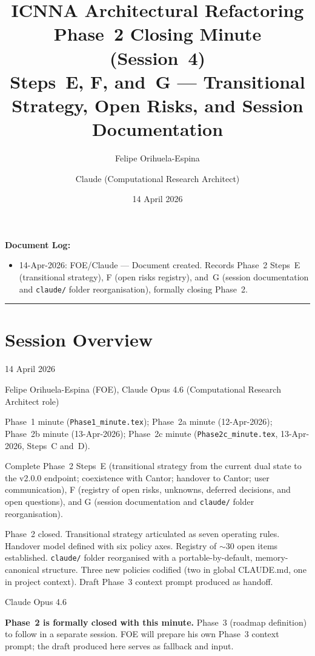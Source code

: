 \documentclass[11pt,a4paper]{article}
\title{ICNNA Architectural Refactoring\\Phase~2 Closing Minute (Session~4)\\
\large Steps~E, F, and~G --- Transitional Strategy, Open Risks, and Session Documentation}
\author{Felipe Orihuela-Espina \and Claude (Computational Research Architect)}
\date{14 April 2026}
\begin{document}
\maketitle

\noindent\textbf{Document Log:}
\begin{itemize}[nosep]
    \item 14-Apr-2026: FOE/Claude --- Document created. Records Phase~2 Steps~E (transitional strategy), F (open risks registry), and~G (session documentation and \texttt{claude/} folder reorganisation), formally closing Phase~2.
\end{itemize}

\vspace{1em}
\hrule
\vspace{1em}

\section{Session Overview}

\begin{description}[style=nextline]
    \item[Date:] 14 April 2026
    \item[Participants:] Felipe Orihuela-Espina (FOE), Claude Opus 4.6 (Computational Research Architect role)
    \item[Predecessors:] Phase~1 minute (\texttt{Phase1\_minute.tex}); Phase~2a minute (12-Apr-2026); Phase~2b minute (13-Apr-2026); Phase~2c minute (\texttt{Phase2c\_minute.tex}, 13-Apr-2026, Steps~C and~D).
    \item[Objective:] Complete Phase~2 Steps~E (transitional strategy from the current dual state to the v2.0.0 endpoint; coexistence with Cantor; handover to Cantor; user communication), F (registry of open risks, unknowns, deferred decisions, and open questions), and G (session documentation and \texttt{claude/} folder reorganisation).
    \item[Outcome:] Phase~2 closed. Transitional strategy articulated as seven operating rules. Handover model defined with six policy axes. Registry of $\sim$30 open items established. \texttt{claude/} folder reorganised with a portable-by-default, memory-canonical structure. Three new policies codified (two in global CLAUDE.md, one in project context). Draft Phase~3 context prompt produced as handoff.
    \item[Model used:] Claude Opus 4.6
    \item[Status:] \textbf{Phase~2 is formally closed with this minute.} Phase~3 (roadmap definition) to follow in a separate session. FOE will prepare his own Phase~3 context prompt; the draft produced here serves as fallback and input.
\end{description}
\end{document}
